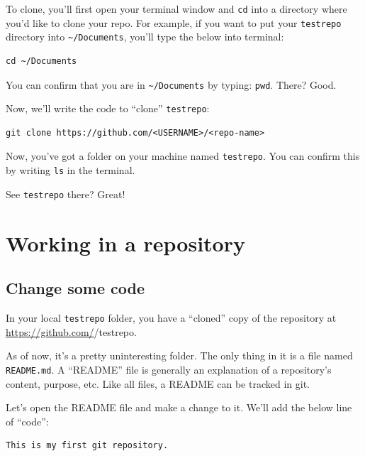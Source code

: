 \documentclass[
]{book}
\begin{document}
To clone, you'll first open your terminal window and \texttt{cd} into a directory where you'd like to clone your repo. For example, if you want to put your \texttt{testrepo} directory into \texttt{\textasciitilde{}/Documents}, you'll type the below into terminal:

\begin{verbatim}
cd ~/Documents
\end{verbatim}

You can confirm that you are in \texttt{\textasciitilde{}/Documents} by typing: \texttt{pwd}. There? Good.

Now, we'll write the code to ``clone'' \texttt{testrepo}:

\begin{verbatim}
git clone https://github.com/<USERNAME>/<repo-name>
\end{verbatim}

Now, you've got a folder on your machine named \texttt{testrepo}. You can confirm this by writing \texttt{ls} in the terminal.

See \texttt{testrepo} there? Great!

\hypertarget{working-in-a-repository}{%
\section*{Working in a repository}\label{working-in-a-repository}}

\hypertarget{change-some-code}{%
\subsection*{Change some code}\label{change-some-code}}

In your local \texttt{testrepo} folder, you have a ``cloned'' copy of the repository at \url{https://github.com/}/testrepo.

As of now, it's a pretty uninteresting folder. The only thing in it is a file named \texttt{README.md}. A ``README'' file is generally an explanation of a repository's content, purpose, etc. Like all files, a README can be tracked in git.

Let's open the README file and make a change to it. We'll add the below line of ``code'':

\begin{verbatim}
This is my first git repository.
\end{verbatim}
\end{document}
